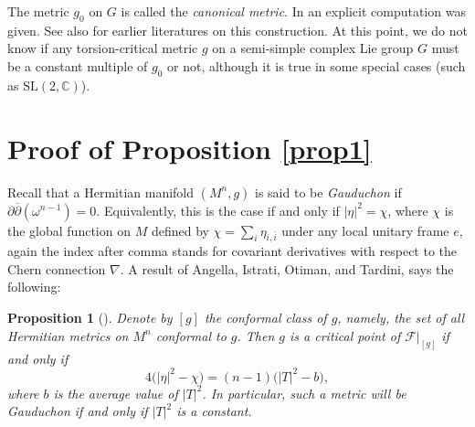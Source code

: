 \documentclass{amsart}
\newtheorem{proposition}{Proposition}
\begin{document}
The metric $g_0$ on $G$ is called the {\em canonical metric}. In \cite{PodestaZ} an explicit computation was given. See also \cite{Gordon, Helgason, Lafuente} for earlier literatures on this construction. At this point, we do not know if any torsion-critical metric $g$ on a semi-simple complex Lie group $G$ must be a constant multiple of $g_0$ or not, although it is true in some special cases (such as $\mbox{SL}(2, {\mathbb C})$). 





\vspace{0.3cm}




\section{Proof of Proposition \ref{prop1}} 

Recall that a Hermitian manifold $(M^n,g)$ is said to be {\em Gauduchon} if $\partial \overline{\partial} (\omega^{n-1})=0$. Equivalently, this is the case if and only if $|\eta|^2 = \chi$, where $\chi $ is the global function on $M$ defined by $\chi = \sum_i 
\eta_{i,\bar{i}}$ under any local unitary frame $e$, again the index after comma stands for covariant derivatives with respect to the Chern connection $\nabla$. 
A result of Angella, Istrati, Otiman, and Tardini, \cite[Proposition 17]{AIOT} says the following:

\begin{proposition}[\cite{AIOT}] \label{propAIOT}
Denote by $[g]$ the conformal class of $g$, namely, the set of all Hermitian metrics on $M^n$ conformal to $g$. Then $g$ is a critical point of ${\mathcal F}|_{[g]}$ if and only if
\begin{equation}\label{eq:trace}
4\big(|\eta|^2-\chi \big) = (n-1) \big(|T|^2-b\big),
\end{equation}
where $b$ is the average value of $|T|^2$. In particular, such a metric will be Gauduchon if and only if $|T|^2$ is a constant.
\end{proposition}
\end{document}
